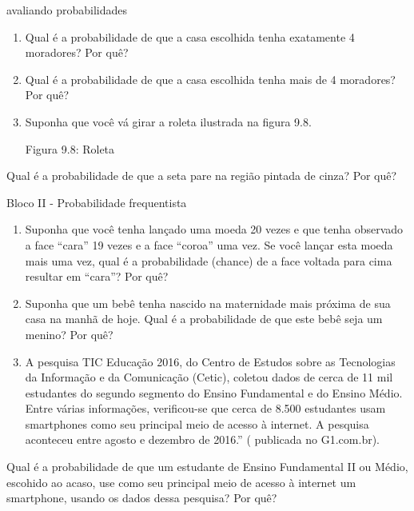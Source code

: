 \begin{task}{avaliando probabilidades}
\begin{enumerate}
\item {} 
Qual é a probabilidade de que a casa escolhida tenha exatamente 4 moradores? Por quê?

\item {} 
Qual é a probabilidade de que a casa escolhida tenha mais de 4 moradores? Por quê?

\item {} 
Suponha que você vá girar a roleta ilustrada na figura 9.8.

\begin{figure}[H]
\centering

\noindent{}
\end{figure}

Figura 9.8: Roleta

\end{enumerate}

Qual é a probabilidade de que a seta pare na região pintada de cinza? Por quê?

Bloco II - Probabilidade frequentista
\begin{enumerate}
\item {} 
Suponha que você tenha lançado uma moeda 20 vezes e que tenha observado a face “cara” 19 vezes e a face “coroa” uma vez. Se você lançar esta moeda mais uma vez, qual é a probabilidade (chance) de a face voltada para cima resultar em “cara”? Por quê?

\item {} 
Suponha que um bebê tenha nascido na maternidade mais próxima de sua casa na manhã de hoje. Qual é a probabilidade de que este bebê seja um menino? Por quê?

\item {} 
A pesquisa TIC Educação 2016, do Centro de Estudos sobre as Tecnologias da Informação e da Comunicação (Cetic), coletou dados de cerca de 11 mil estudantes do segundo segmento do Ensino Fundamental e do Ensino Médio. Entre várias informações, verificou-se que cerca de 8.500 estudantes usam smartphones como seu principal meio de acesso à internet. A pesquisa aconteceu entre agosto e dezembro de 2016.” ( publicada no G1.com.br).

\end{enumerate}

Qual é a probabilidade de que um estudante de Ensino Fundamental II ou Médio, escohido ao acaso, use como seu principal meio de acesso à internet um smartphone, usando os dados dessa pesquisa? Por quê?


\end{task}
